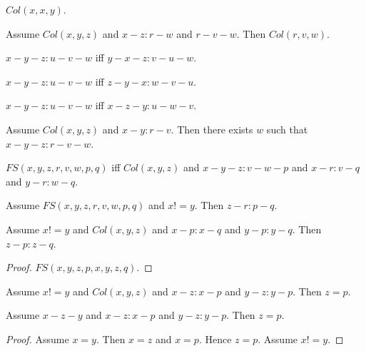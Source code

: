 \documentclass{article}
\begin{document}
\begin{forthel}
    \begin{lemma}[L4o12]
      $Col(x,x,y)$.
    \end{lemma}

    \begin{lemma}[L4o13]
      Assume $Col(x,y,z)$ and $x-z : r-w$ and $r-v-w$. Then $Col(r,v,w)$.
    \end{lemma}

    \begin{lemma}[L4o14o1]
      $x-y-z : u-v-w$ iff $y-x-z : v-u-w$.
    \end{lemma}

    \begin{lemma}[L4o14o2]
      $x-y-z : u-v-w$ iff $z-y-x : w-v-u$.
    \end{lemma}

    \begin{lemma}[L4o14o3]
      $x-y-z : u-v-w$ iff $x-z-y : u-w-v$.
    \end{lemma}

    \begin{axiom}[L4o14]
      Assume $Col(x,y,z)$ and $x-y : r-v$. Then there exists $w$ such that $x-y-z : r-v-w$.
    \end{axiom}

    \begin{definition}[L4o15]
      $FS(x,y,z,r,v,w,p,q)$ iff $Col(x,y,z)$ and $x-y-z : v-w-p$ and $x-r : v-q$ and $y-r : w-q$.
    \end{definition}

    \begin{axiom}[L4o16]
      Assume $FS(x,y,z,r,v,w,p,q)$ and $x != y$. Then $z-r : p-q$.
    \end{axiom}


    \begin{lemma}[L4o17]
      Assume $x != y$ and $Col(x,y,z)$ and $x-p : x-q$ and $y-p : y-q$. Then $z-p : z-q$.
    \end{lemma}
    \begin{proof}
    	$FS(x,y,z,p,x,y,z,q)$.
    \end{proof}


    \begin{lemma}[L4o18]
      Assume $x != y$ and $Col(x,y,z)$ and $x-z : x-p$ and $y-z : y-p$. Then $z = p$.
    \end{lemma}

    \begin{lemma}[L4o19]
      Assume $x-z-y$ and $x-z : x-p$ and $y-z : y-p$. Then $z = p$.
    \end{lemma}
    \begin{proof}
      Assume $x = y$. Then $x = z$ and $x = p$. Hence $z = p$. Assume $x != y$.
    \end{proof}
  \end{forthel}
\end{document}
